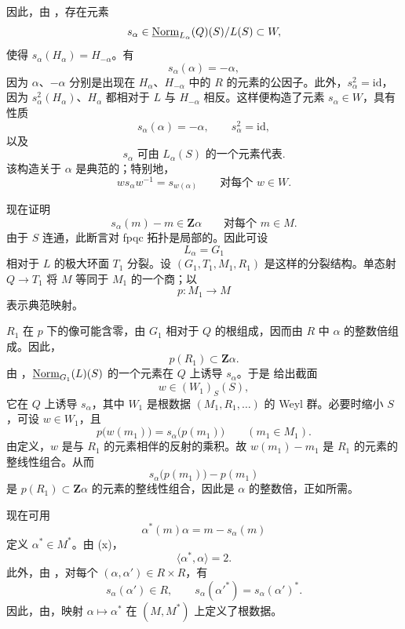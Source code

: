 因此，由 ，存在元素
\[
 s_\alpha\in\underline{\operatorname{Norm}}_{L_\alpha}(Q)(S)/L(S)\subset W,
\]
使得 \(s_\alpha(H_\alpha)=H_{-\alpha}\)。有
\[
 s_\alpha(\alpha)=-\alpha,
\]
因为 \(\alpha\)、\(-\alpha\) 分别是出现在 \(H_\alpha\)、\(H_{-\alpha}\) 中的 \(R\) 的元素的公因子。此外，\(s_\alpha^2=\mathrm{id}\)，因为 \(s_\alpha^2(H_\alpha)\)、\(H_\alpha\) 都相对于 \(L\) 与 \(H_{-\alpha}\) 相反。这样便构造了元素 \(s_\alpha\in W\)，具有性质
\[
\tag{x}\label{sga3:xxvi:subsection:7-4-2:equation:x}
 s_\alpha(\alpha)=-\alpha,\qquad s_\alpha^2=\mathrm{id},
\]
以及
\[
\tag{xx}\label{sga3:xxvi:subsection:7-4-2:equation:xx}
 s_\alpha\text{ 可由 }L_\alpha(S)\text{ 的一个元素代表}.
\]
该构造关于 \(\alpha\) 是典范的；特别地，
\[
\tag{xxx}\label{sga3:xxvi:subsection:7-4-2:equation:xxx}
 w s_\alpha w^{-1}=s_{w(\alpha)}
 \qquad\text{对每个 }w\in W.
\]


现在证明
\[
\tag{xxxx}\label{sga3:xxvi:subsection:7-4-3:equation:xxxx}
 s_\alpha(m)-m\in\mathbf Z\alpha
 \qquad\text{对每个 }m\in M.
\]
由于 \(S\) 连通，此断言对 fpqc 拓扑是局部的。因此可设
\[
 L_\alpha=G_1
\]
相对于 \(L\) 的极大环面 \(T_1\) 分裂。设 \((G_1,T_1,M_1,R_1)\) 是这样的分裂结构。单态射 \(Q\to T_1\) 将 \(M\) 等同于 \(M_1\) 的一个商；以
\[
 p:M_1\longrightarrow M
\]
表示典范映射。

\(R_1\) 在 \(p\) 下的像可能含零，由 \(G_1\) 相对于 \(Q\) 的根组成，因而由 \(R\) 中 \(\alpha\) 的整数倍组成。因此，
\[
 p(R_1)\subset\mathbf Z\alpha.
\]
由 \textup{}，\(\underline{\operatorname{Norm}}_{G_1}(L)(S)\) 的一个元素在 \(Q\) 上诱导 \(s_\alpha\)。于是 给出截面
\[
 w\in(W_1)_S(S),
\]
它在 \(Q\) 上诱导 \(s_\alpha\)，其中 \(W_1\) 是根数据 \((M_1,R_1,\ldots)\) 的 Weyl 群。必要时缩小 \(S\)，可设 \(w\in W_1\)，且
\[
 p\bigl(w(m_1)\bigr)=s_\alpha\bigl(p(m_1)\bigr)
 \qquad(m_1\in M_1).
\]
由定义，\(w\) 是与 \(R_1\) 的元素相伴的反射的乘积。故 \(w(m_1)-m_1\) 是 \(R_1\) 的元素的整线性组合。从而
\[
 s_\alpha\bigl(p(m_1)\bigr)-p(m_1)
\]
是 \(p(R_1)\subset\mathbf Z\alpha\) 的元素的整线性组合，因此是 \(\alpha\) 的整数倍，正如所需。


现在可用
\[
 \alpha^*(m)\alpha=m-s_\alpha(m)
\]
定义 \(\alpha^*\in M^*\)。由 \textup{(x)}，
\[
 \langle\alpha^*,\alpha\rangle=2.
\]
此外，由 \textup{}，对每个 \((\alpha,\alpha')\in R\times R\)，有
\[
 s_\alpha(\alpha')\in R,\qquad
 s_\alpha(\alpha'^*)=s_\alpha(\alpha')^*.
\]
因此，由，映射 \(\alpha\mapsto\alpha^*\) 在 \((M,M^*)\) 上定义了根数据。

